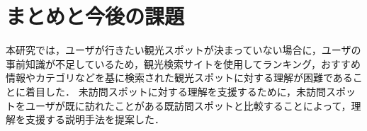 \documentclass[submit,techrep,noauthor]{ipsj}
\begin{document}
%

\section{まとめと今後の課題}
\label{sec:まとめと今後の課題}

本研究では，ユーザが行きたい観光スポットが決まっていない場合に，ユーザの事前知識が不足しているため，観光検索サイトを使用してランキング，おすすめ情報やカテゴリなどを基に検索された観光スポットに対する理解が困難であることに着目した．
未訪問スポットに対する理解を支援するために，未訪問スポットをユーザが既に訪れたことがある既訪問スポットと比較することによって，理解を支援する説明手法を提案した．
\end{document}
